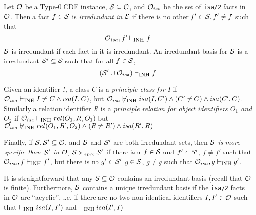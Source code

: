 
  
 
\begin{definition} \label{def:redund} 
Let ${\cal O}$ be a Type-0 CDF instance, ${\cal S} \subseteq {\cal O}$, and
${\cal O}_{isa}$ be the set of {\tt isa/2} facts in ${\cal O}$.  Then a fact $f
\in {\cal S}$ is {\em irredundant in ${\cal S}$} if there is no other $f' \in
{\cal S}, f' \not= f$ such that
\[
{\cal O}_{isa},f' \vdash_{\mbox{\sc inh}} f
\]
${\cal S}$ is irredundant if each fact in it is irredundant.  An
irredundant basis for ${\cal S}$ is a irredundant ${\cal S}' \subseteq {\cal S}$ such
that for all $f \in {\cal S}$, 
\[
({\cal S}' \cup {\cal O}_{isa}) \vdash_{\mbox{\sc inh}} f
\]

Given an identifier $I$, a class $C$ is a {\em principle class for
$I$} if ${\cal O}_{isa} \vdash_{\mbox{\sc inh}} I \not= C \wedge isa(I,C)$, but ${\cal O}_{isa}
\not \vdash_{\mbox{\sc inh}} isa(I,C') \wedge (C' \not = C) \wedge isa(C',C)$.  Similarly
a relation identifier $R$ is a {\em principle relation for object
identifiers $O_1$ and $O_2$} if ${\cal O}_{isa} \vdash_{\mbox{\sc inh}} rel(O_1,R,O_1)$
but ${\cal O}_{isa} \not \vdash_{\mbox{\sc inh}} rel(O_1,R',O_2) \wedge (R \not = R')
\wedge isa(R',R)$

Finally, if ${\cal S}, {\cal S}' \subseteq {\cal O}$, and ${\cal S}$ and ${\cal S}'$ are both
irredundant sets, then {\em ${\cal S}$ is more specific than ${\cal S}'$ in
${\cal O}$}, ${\cal S} \succ_{spec} {\cal S}'$ if there is a $f \in {\cal S}$ and $f' \in
{\cal S}'$, $f \not= f'$ such that ${\cal O}_{isa},f \vdash_{\mbox{\sc inh}} f'$, but there is
no $g' \in {\cal S}'$ $g \in {\cal S}$, $g \not = g$ such that ${\cal O}_{isa},g
\vdash_{\mbox{\sc inh}} g'$.
%
\end{definition}
\noindent
It is straightforward that any ${\cal S} \subseteq {\cal O}$ contains an
irredundant basis (recall that ${\cal O}$ is finite).  Furthermore, ${\cal S}$
contains a unique irredundant basis if the {\tt isa/2} facts in ${\cal O}$
are ``acyclic'', i.e. if there are no two non-identical identifiers
$I,I' \in {\cal O}$ such that $\vdash_{\mbox{\sc inh}} isa(I,I')$ and $\vdash_{\mbox{\sc inh}} isa(I',I)$


